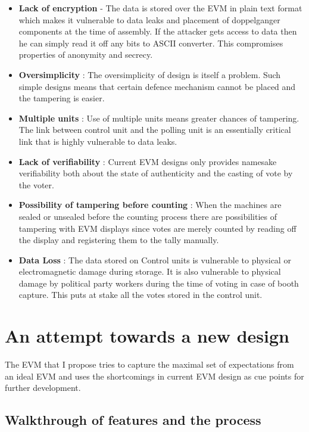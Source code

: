 \documentclass[a4paper,12pt,openany]{book}
\begin{document}
\begin{itemize}
\item \textbf{Lack of encryption} - The data is stored over the EVM in plain text format which makes it vulnerable to data leaks and placement of doppelganger components at the time of assembly. If the attacker gets access to data then he can simply read it off any bits to ASCII converter. This compromises properties of anonymity and secrecy.

\item \textbf{Oversimplicity} : The oversimplicity of design is itself a problem. Such simple designs means that certain defence mechanism cannot be placed and the tampering is easier.

\item \textbf{Multiple units} : Use of multiple units means greater chances of tampering. The link between control unit and the polling unit is an essentially critical link that is highly vulnerable to data leaks.

\item \textbf{Lack of verifiability} : Current EVM designs only provides namesake verifiability both about the state of authenticity and the casting of vote by the voter.

\item \textbf{Possibility of tampering before counting} : When the machines are sealed or unsealed before the counting process there are possibilities of tampering with EVM displays since votes are merely counted by reading off the display and registering them to the tally manually.

\item \textbf{Data Loss} : The data stored on Control units is vulnerable to physical or electromagnetic damage during storage. It is also vulnerable to physical damage by political party workers during the time of voting in case of booth capture. This puts at stake all the votes stored in the control unit.
\end{itemize}

\chapter{An attempt towards a new design}
The EVM that I propose tries to capture the maximal set of expectations from an ideal EVM and uses the shortcomings in current EVM design as cue points for further development.
\section{Walkthrough of features and the process}
\end{document}

